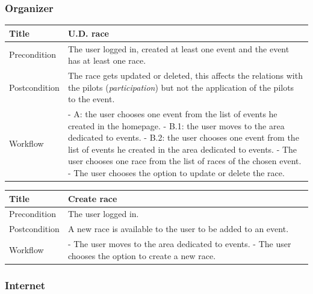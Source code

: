 \documentclass{beamer}
\begin{document}
\begin{frame}
    \frametitle{Organizer}
    \begin{table}
        \tiny
        \begin{tabular}{|p{2cm}|p{6cm}|}
        \hline
        Title & \textbf{U.D. race} \\
        \hline
        Precondition & The user logged in, created at least one event and the event has at least one race. \\
        \hline
        Postcondition & The race gets updated or deleted, this affects the relations with the pilots (\textit{participation})
        but not the application of the pilots to the event. \\
        \hline
        Workflow &
        - A: the user chooses one event from the list of events he created in the homepage. \newline
        - B.1: the user moves to the area dedicated to events. \newline
        - B.2: the user chooses one event from the list of events he created in the area dedicated to events. \newline
        - The user chooses one race from the list of races of the chosen event. \newline
        - The user chooses the option to update or delete the race. \\
        \hline
        \end{tabular}
\end{table}

\begin{table}
    \tiny
    \begin{tabular}{|p{2cm}|p{6cm}|}
    \hline
    Title & \textbf{Create race} \\
    \hline
    Precondition & The user logged in. \\
    \hline
    Postcondition & A new race is available to the user to be added to an event. \\
    \hline
    Workflow &
    - The user moves to the area dedicated to events. \newline
    - The user chooses the option to create a new race. \\
    \hline
    \end{tabular}
\end{table}

\end{frame}


\subsubsection{Internet}
\end{document}
